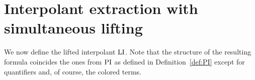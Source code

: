 


\section{Interpolant extraction with simultaneous lifting}

We now define the lifted interpolant $\operatorname{LI}$.
Note that the structure of the resulting formula coincides the ones from $\operatorname{PI}$ as defined in Definition~\ref{def:PI} except for quantifiers and, of course, the colored terms.

